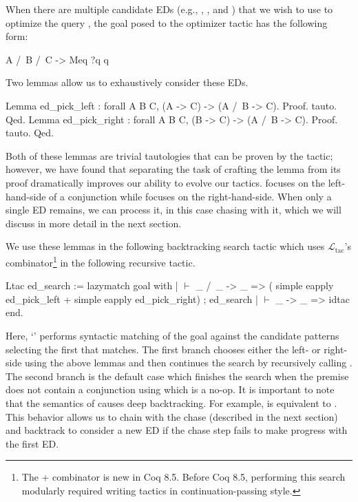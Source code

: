 \documentclass[preprint]{sigplanconf}
\newcommand{\ltac}[0]{\ensuremath{\mathcal{L}_{\mathrm{tac}}}}
\begin{document}
When there are multiple candidate EDs (e.g., , , and ) that we wish to use to optimize the query , the goal posed to the optimizer tactic has the following form:
\begin{coq}
A /\ B /\ C -> Meq ?q q
\end{coq}

Two lemmas allow us to exhaustively consider these EDs.
\begin{coq}
Lemma ed_pick_left : forall {A B C}, (A -> C) -> (A /\ B -> C).
Proof. tauto. Qed.
Lemma ed_pick_right : forall {A B C}, (B -> C) -> (A /\ B -> C).
Proof. tauto. Qed.
\end{coq}
Both of these lemmas are trivial tautologies that can be proven by the  tactic; however, we have found that separating the task of crafting the lemma from its proof dramatically improves our ability to evolve our tactics.
 focuses on the left-hand-side of a conjunction while  focuses on the right-hand-side.
When only a single ED remains, we can process it, in this case chasing with it, which we will discuss in more detail in the next section.

We use these lemmas in the following backtracking search tactic which uses \ltac's \coqe{+} combinator\footnote{The + combinator is new in Coq 8.5. Before Coq 8.5, performing this search modularly required writing tactics in continuation-passing style.} in the following recursive tactic.
\begin{coq}
Ltac ed_search :=
  lazymatch goal with
  | $\vdash$ _ /\ _ -> _ =>
    (  simple eapply ed_pick_left
     + simple eapply ed_pick_right) ; ed_search
  | $\vdash$ _ -> _ => idtac
  end.
\end{coq}
Here, `' performs syntactic matching of the goal against the candidate patterns selecting the first that matches.
The first branch chooses either the left- or right-side using the above lemmas and then continues the search by recursively calling .
The second branch is the default case which finishes the search when the premise does not contain a conjunction using  which is a no-op.
It is important to note that the semantics of \coqe{+} causes deep backtracking.
For example,  is equivalent to .
This behavior allows us to chain  with the chase (described in the next section) and backtrack to consider a new ED if the chase step fails to make progress with the first ED.
\end{document}
